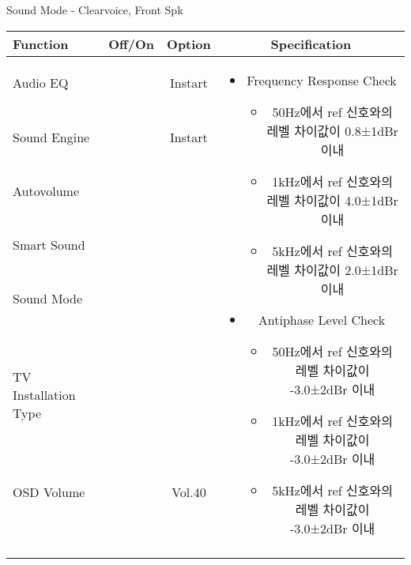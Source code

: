 \begin{frame}[t]{Sound Mode - Clearvoice, Front Spk}
\begin{tiny}
\begin{tabular}{@{}lccc@{}}
\toprule
Function & Off/On & Option & Specification \\
\midrule
Audio EQ & \color{black}{Off} & Instart &
\multirow{10}{60mm}{
\begin{itemize}
	\item Frequency Response Check
	\begin{itemize}
		\item 50Hz에서 ref 신호와의 레벨 차이값이 0.8±1dBr 이내
		\item 1kHz에서 ref 신호와의 레벨 차이값이 4.0±1dBr 이내
		\item 5kHz에서 ref 신호와의 레벨 차이값이 2.0±1dBr 이내	
	\end{itemize}
	\item Antiphase Level Check
	\begin{itemize}
		\item 50Hz에서 ref 신호와의 레벨 차이값이 -3.0±2dBr 이내
		\item 1kHz에서 ref 신호와의 레벨 차이값이 -3.0±2dBr 이내
		\item 5kHz에서 ref 신호와의 레벨 차이값이 -3.0±2dBr 이내
	\end{itemize}	
\end{itemize}
} \\
Sound Engine & \color{blue}{On} & Instart & \\
Autovolume & \color{black}{Off} & & \\
Smart Sound & \color{black}{Off} & & \\
Sound Mode & \color{blue}{On} & \color{blue}{Clearvoice} & \\
TV Installation Type & \color{blue}{On} & \color{black}{Standtype1} & \\
OSD Volume & \color{blue}{On} & Vol.40 & \\
& & & \\
& & & \\
& & & \\
& & & \\\midrule
\end{tabular}
\end{tiny}


\end{frame}



